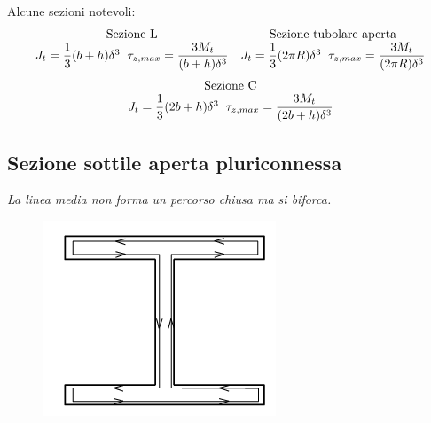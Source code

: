 			Alcune sezioni notevoli:
			\[\begin{array}{ccc}
				\text{Sezione L} & \text{Sezione tubolare aperta} \\
				J_t = \dfrac{1}{3}(b+h)\delta^3 \hspace{0.2cm} \tau_{z,max} =\dfrac{3M_t}{(b+h)\delta^3}  & J_t = \dfrac{1}{3}(2\pi R)\delta^3\hspace{0.2cm}  \tau_{z,max} =\dfrac{3M_t}{(2\pi R)\delta^3}   
			\end{array}\]
			\[ \begin{array}{c}
				\text{Sezione C} \\
				J_t = \dfrac{1}{3}(2b+h)\delta^3 \hspace{0.2cm}  \tau_{z,max} =\dfrac{3M_t}{(2b+h)\delta^3} 
			\end{array}\]
		
\subsection{Sezione sottile aperta pluriconnessa}
		\textit{La linea media non forma un percorso chiusa ma si biforca.}  
		\begin{figure}[H]
			\centering
			\includegraphics[width=0.3\linewidth]{immagini_5/screenshot011}
			\label{fig:screenshot011}
		\end{figure}
		
